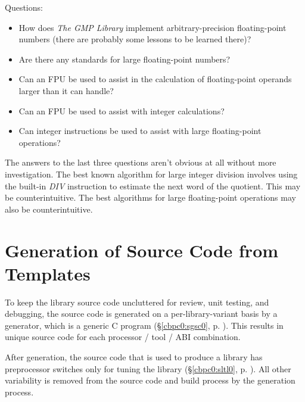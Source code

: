 Questions:

\begin{itemize}
\item How does \emph{The GMP Library} implement
      arbitrary-precision floating-point numbers (there are 
      probably some lessons to be learned there)?
\item Are there any standards for large
      floating-point numbers?
\item Can an FPU be used to assist in the calculation of
      floating-point operands larger than it can handle?
\item Can an FPU be used to assist with integer
      calculations?
\item Can integer instructions be used to assist with large
      floating-point operations?
\end{itemize}

The answers to the last three questions aren't obvious at 
all without more investigation.  The best known algorithm 
for large integer division involves using the built-in 
\emph{DIV} instruction to estimate the next word of the 
quotient.  This may be counterintuitive.  The best 
algorithms for large floating-point operations may also be 
counterintuitive.  


\section{Generation of Source Code from Templates}
\label{cldd0:sgst0}

To keep the library source code uncluttered for review, unit 
testing, and debugging, the source code is generated on a 
per-library-variant basis by a generator, which is a generic 
C program (\S{}\ref{cbpc0:sgsc0}, p.  
\pageref{cbpc0:sgsc0}).  This results in unique source code 
for each processor / tool / ABI combination.  

After generation, the source code that is used to produce a 
library has preprocessor switches only for tuning the 
library (\S{}\ref{cbpc0:sltl0}, p.  \pageref{cbpc0:sltl0}).  
All other variability is removed from the source code and 
build process by the generation process.  


